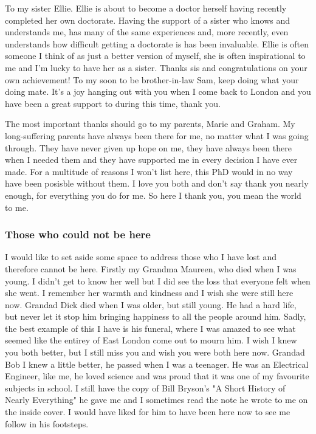 To my sister Ellie. Ellie is about to become a doctor herself having recently completed her own doctorate. Having the support of a sister who knows and understands me, has many of the same experiences and, more recently, even understands how difficult getting a doctorate is has been invaluable. Ellie is often someone I think of as just a better version of myself, she is often inspirational to me and I'm lucky to have her as a sister. Thanks sis and congratulations on your own achievement! To my soon to be brother-in-law Sam, keep doing what your doing mate. It's a joy hanging out with you when I come back to London and you have been a great support to during this time, thank you.

The most important thanks should go to my parents, Marie and Graham. My long-suffering parents have always been there for me, no matter what I was going through. They have never given up hope on me, they have always been there when I needed them and they have supported me in every decision I have ever made. For a multitude of reasons I won't list here, this PhD would in no way have been posisble without them. I love you both and don't say thank you nearly enough, for everything you do for me. So here I thank you, you mean the world to me.

\subsubsection{Those who could not be here}
I would like to set aside some space to address those who I have lost and therefore cannot be here. Firstly my Grandma Maureen, who died when I was young. I didn't get to know her well but I did see the loss that everyone felt when she went. I remember her warmth and kindness and I wish she were still here now. Grandad Dick died when I was older, but still young. He had a hard life, but never let it stop him bringing happiness to all the people around him. Sadly, the best example of this I have is his funeral, where I was amazed to see what seemed like the entirey of East London come out to mourn him. I wish I knew you both better, but I still miss you and wish you were both here now. Grandad Bob I knew a little better, he passed when I was a teenager. He was an Electrical Engineer, like me, he loved science and was proud that it was one of my favourite subjects in school. I still have the copy of Bill Bryson's "A Short History of Nearly Everything" he gave me and I sometimes read the note he wrote to me on the inside cover. I would have liked for him to have been here now to see me follow in his footsteps.

